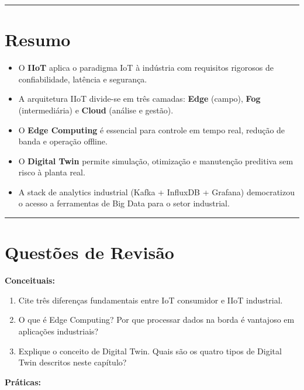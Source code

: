 \begin{center}\rule{0.5\linewidth}{0.5pt}\end{center}

\section{Resumo}\label{resumo}

\begin{itemize}
\tightlist
\item
  O \textbf{IIoT} aplica o paradigma IoT à indústria com requisitos rigorosos de confiabilidade, latência e segurança.
\item
  A arquitetura IIoT divide-se em três camadas: \textbf{Edge} (campo), \textbf{Fog} (intermediária) e \textbf{Cloud} (análise e gestão).
\item
  O \textbf{Edge Computing} é essencial para controle em tempo real, redução de banda e operação offline.
\item
  O \textbf{Digital Twin} permite simulação, otimização e manutenção preditiva sem risco à planta real.
\item
  A stack de analytics industrial (Kafka + InfluxDB + Grafana) democratizou o acesso a ferramentas de Big Data para o setor industrial.
\end{itemize}

\begin{center}\rule{0.5\linewidth}{0.5pt}\end{center}

\section{Questões de Revisão}\label{questuxf5es-de-revisuxe3o}

\textbf{Conceituais:}

\begin{enumerate}
\def\labelenumi{\arabic{enumi}.}
\tightlist
\item
  Cite três diferenças fundamentais entre IoT consumidor e IIoT industrial.
\item
  O que é Edge Computing? Por que processar dados na borda é vantajoso em aplicações industriais?
\item
  Explique o conceito de Digital Twin. Quais são os quatro tipos de Digital Twin descritos neste capítulo?
\end{enumerate}

\textbf{Práticas:}

